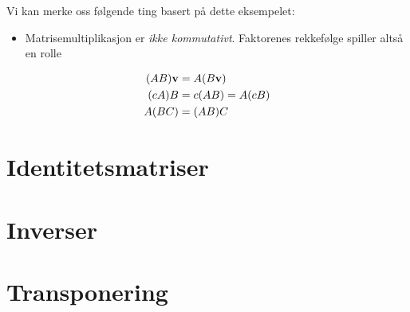Vi kan merke oss følgende ting basert på dette eksempelet:
\begin{itemize}
\item Matrisemultiplikasjon er \emph{ikke kommutativt}.  Faktorenes rekkefølge spiller altså en rolle %
\end{itemize}

\begin{thm}
\begin{align*}
(AB) \mathbf{v} &= A (B \mathbf{v}) \\
(c A) B &= c (AB) = A (cB) \\
A(BC) &= (AB)C
\end{align*}
\end{thm}


\section*{Identitetsmatriser}


\section*{Inverser}


\section*{Transponering}


\kapittelslutt
